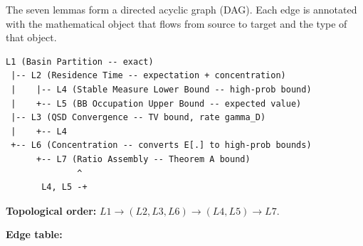 \documentclass[11pt]{article}
\begin{document}
The seven lemmas form a directed acyclic graph (DAG).
Each edge is annotated with the mathematical object that flows from
source to target and the type of that object.

\begin{verbatim}
L1 (Basin Partition -- exact)
 |-- L2 (Residence Time -- expectation + concentration)
 |    |-- L4 (Stable Measure Lower Bound -- high-prob bound)
 |    +-- L5 (BB Occupation Upper Bound -- expected value)
 |-- L3 (QSD Convergence -- TV bound, rate gamma_D)
 |    +-- L4
 +-- L6 (Concentration -- converts E[.] to high-prob bounds)
      +-- L7 (Ratio Assembly -- Theorem A bound)
              ^
       L4, L5 -+
\end{verbatim}

\medskip
\noindent
\textbf{Topological order:}
$L1 \to (L2, L3, L6) \to (L4, L5) \to L7$.

\medskip
\noindent
\textbf{Edge table:}
\end{document}
